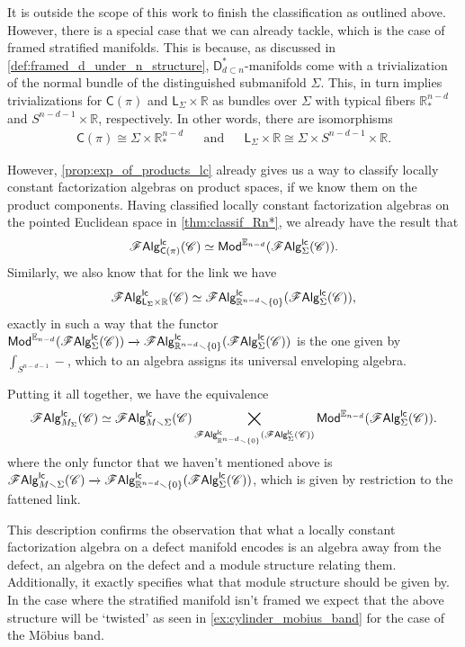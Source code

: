 \documentclass[../text]{subfiles}
\begin{document}
It is outside the scope of this work to finish the classification as outlined above. However, there is a special case that we can already tackle, which is the case of framed stratified manifolds. This is because, as discussed in \cref{def:framed_d_under_n_structure}, $\mathsf{D}_{d \subset n}^*$-manifolds come with a trivialization of the normal bundle of the distinguished submanifold $\Sigma$. This, in turn implies trivializations for $\mathsf{C}(\pi)$ and $\mathsf{L}_{\Sigma} \times \mathbb{R}$ as bundles over $\Sigma$ with typical fibers $\mathbb{R}^{n-d}_*$ and $S^{n-d-1} \times \mathbb{R}$, respectively. In other words, there are isomorphisms
%
\begin{align}
    &\mathsf{C}(\pi) \cong \Sigma \times \mathbb{R}^{n-d}_*& &\mathrm{and}& &\mathsf{L}_{\Sigma} \times \mathbb{R} \cong \Sigma \times S^{n-d-1} \times \mathbb{R}.&
\end{align}

However, \cref{prop:exp_of_products_lc} already gives us a way to classify locally constant factorization algebras on product spaces, if we know them on the product components. Having classified locally constant factorization algebras on the pointed Euclidean space in \cref{thm:classif_Rn*}, we already have the result that
%
\begin{equation}
    \mathscr{F} \mathsf{Alg}^{\mathsf{lc}}_{\mathsf{C}(\pi)} (\mathscr{C}) \simeq \mathsf{Mod}^{\mathbb{E}_{n-d}} (\mathscr{F} \mathsf{Alg}^{\mathsf{lc}}_{\Sigma} (\mathscr{C})).
\end{equation}
%
Similarly, we also know that for the link we have
%
%
\begin{equation}
    \mathscr{F} \mathsf{Alg}^{\mathsf{lc}}_{\mathsf{L}_{\Sigma} \times \mathbb{R}} (\mathscr{C}) \simeq \mathscr{F} \mathsf{Alg}^{\mathsf{lc}}_{\mathbb{R}^{n-d} \smallsetminus \{ 0\} } (\mathscr{F} \mathsf{Alg}^{\mathsf{lc}}_{\Sigma} (\mathscr{C})),
\end{equation}
%
exactly in such a way that the functor $\mathsf{Mod}^{\mathbb{E}_{n-d}} (\mathscr{F} \mathsf{Alg}^{\mathsf{lc}}_{\Sigma} (\mathscr{C})) \xrightarrow{} \mathscr{F} \mathsf{Alg}^{\mathsf{lc}}_{\mathbb{R}^{n-d} \smallsetminus \{ 0\} } (\mathscr{F} \mathsf{Alg}^{\mathsf{lc}}_{\Sigma} (\mathscr{C}))$ is the one given by $\int_{S^{n-d-1}} -$, which to an algebra assigns its universal enveloping algebra.

Putting it all together, we have the equivalence
%
\begin{equation}
    \mathscr{F} \mathsf{Alg}^{\mathsf{lc}}_{M_\Sigma} (\mathscr{C}) \simeq \mathscr{F} \mathsf{Alg}^{\mathsf{lc}}_{M \smallsetminus \Sigma} (\mathscr{C}) \bigtimes_{\mathscr{F} \mathsf{Alg}^{\mathsf{lc}}_{\mathbb{R}^{n-d} \smallsetminus \{0\}} (\mathscr{F} \mathsf{Alg}^{\mathsf{lc}}_{\Sigma} (\mathscr{C}))} \mathsf{Mod}^{\mathbb{E}_{n-d}} (\mathscr{F} \mathsf{Alg}^{\mathsf{lc}}_{\Sigma} (\mathscr{C})).
\end{equation}
%
where the only functor that we haven't mentioned above is $\mathscr{F} \mathsf{Alg}^{\mathsf{lc}}_{M \smallsetminus \Sigma} (\mathscr{C}) \xrightarrow{} \mathscr{F} \mathsf{Alg}^{\mathsf{lc}}_{\mathbb{R}^{n-d} \smallsetminus \{ 0\} } (\mathscr{F} \mathsf{Alg}^{\mathsf{lc}}_{\Sigma} (\mathscr{C}))$, which is given by restriction to the fattened link.

This description confirms the observation that what a locally constant factorization algebra on a defect manifold encodes is an algebra away from the defect, an algebra on the defect and a module structure relating them. Additionally, it exactly specifies what that module structure should be given by. In the case where the stratified manifold isn't framed we expect that the above structure will be `twisted' as seen in \cref{ex:cylinder_mobius_band} for the case of the M\"obius band.
\end{document}
